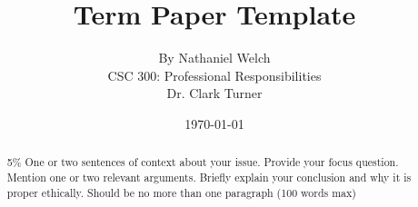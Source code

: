 \documentclass[11pt]{article}
\begin{document}
\title{\vfill Term Paper Template} %
\author{
By Nathaniel Welch\vspace{10pt} \\
CSC 300: Professional Responsibilities\vspace{10pt} \\
Dr. Clark Turner\vspace{10pt} \\
}
\date{\today}

\maketitle

\vfill  %
\begin{abstract}
5\%  One or two sentences of context about your issue. Provide your focus question. Mention one or two relevant arguments.  Briefly explain your conclusion and why it is proper ethically. Should be no more than one paragraph (100 words max) \cite{handout}
\end{abstract}

\thispagestyle{empty} %
\newpage


\thispagestyle{empty}  %
\tableofcontents

\newpage

\end{document}
